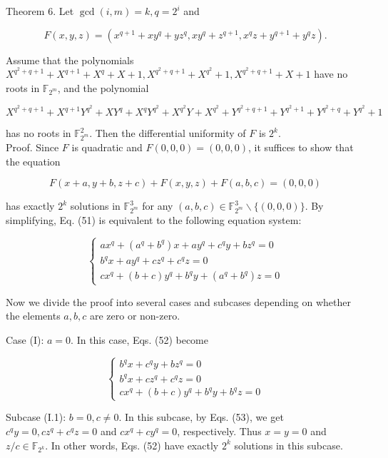 \documentclass[10pt]{article}
\begin{document}
Theorem 6. Let $\operatorname{gcd}(i, m)=k, q=2^{i}$ and

$$
F(x, y, z)=\left(x^{q+1}+x y^{q}+y z^{q}, x y^{q}+z^{q+1}, x^{q} z+y^{q+1}+y^{q} z\right) .
$$

Assume that the polynomials $X^{q^{2}+q+1}+X^{q+1}+X^{q}+X+1, X^{q^{2}+q+1}+X^{q^{2}}+1, X^{q^{2}+q+1}+X+1$ have no roots in $\mathbb{F}_{2^{m}}$, and the polynomial

$$
X^{q^{2}+q+1}+X^{q+1} Y^{q^{2}}+X Y^{q}+X^{q} Y^{q^{2}}+X^{q^{2}} Y+X^{q^{2}}+Y^{q^{2}+q+1}+Y^{q^{2}+1}+Y^{q^{2}+q}+Y^{q^{2}}+1
$$

has no roots in $\mathbb{F}_{2^{m}}^{2}$. Then the differential uniformity of $F$ is $2^{k}$.\\
Proof. Since $F$ is quadratic and $F(0,0,0)=(0,0,0)$, it suffices to show that the equation


\begin{equation*}
F(x+a, y+b, z+c)+F(x, y, z)+F(a, b, c)=(0,0,0) \tag{51}
\end{equation*}


has exactly $2^{k}$ solutions in $\mathbb{F}_{2^{m}}^{3}$ for any $(a, b, c) \in \mathbb{F}_{2^{m}}^{3} \backslash\{(0,0,0)\}$. By simplifying, Eq. (51) is equivalent to the following equation system:

\[
\left\{\begin{array}{l}
a x^{q}+\left(a^{q}+b^{q}\right) x+a y^{q}+c^{q} y+b z^{q}=0  \tag{52.1}\\
b^{q} x+a y^{q}+c z^{q}+c^{q} z=0 \\
c x^{q}+(b+c) y^{q}+b^{q} y+\left(a^{q}+b^{q}\right) z=0
\end{array}\right.
\]

Now we divide the proof into several cases and subcases depending on whether the elements $a, b, c$ are zero or non-zero.

Case (I): $a=0$. In this case, Eqs. (52) become

\[
\left\{\begin{array}{l}
b^{q} x+c^{q} y+b z^{q}=0  \tag{53.1}\\
b^{q} x+c z^{q}+c^{q} z=0 \\
c x^{q}+(b+c) y^{q}+b^{q} y+b^{q} z=0
\end{array}\right.
\]

Subcase (I.1): $b=0, c \neq 0$. In this subcase, by Eqs. (53), we get $c^{q} y=0, c z^{q}+c^{q} z=0$ and $c x^{q}+c y^{q}=0$, respectively. Thus $x=y=0$ and $z / c \in \mathbb{F}_{2^{k}}$. In other words, Eqs. (52) have exactly $2^{k}$ solutions in this subcase.
\end{document}

